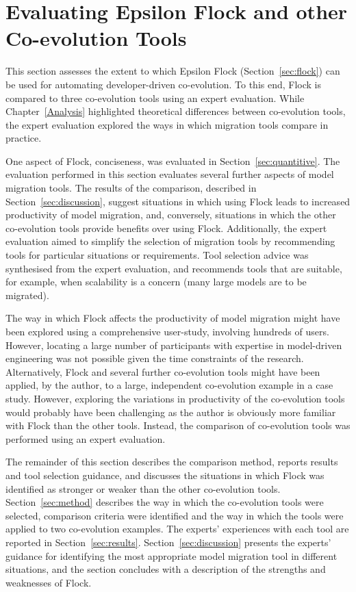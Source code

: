 
\section[Evaluating Epsilon Flock and other Co-evolution Tools][Evaluating Flock and other Co-evolution Tools]{Evaluating Epsilon Flock and other Co-evolution Tools}
\label{sec:collaborative_comparison}
This section assesses the extent to which Epsilon Flock (Section~\ref{sec:flock}) can be used for automating developer-driven co-evolution. To this end, Flock is compared to three co-evolution tools using an expert evaluation. While Chapter~\ref{Analysis} highlighted theoretical differences between co-evolution tools, the expert evaluation explored the ways in which migration tools compare in practice.

One aspect of Flock, conciseness, was evaluated in Section~\ref{sec:quantitive}. The evaluation performed in this section evaluates several further aspects of model migration tools. The results of the comparison, described in Section~\ref{sec:discussion}, suggest situations in which using Flock leads to increased productivity of model migration, and, conversely, situations in which the other co-evolution tools provide benefits over using Flock. Additionally, the expert evaluation aimed to  simplify the selection of migration tools by recommending tools for particular situations or requirements. Tool selection advice was synthesised from the expert evaluation, and recommends tools that are suitable, for example, when scalability is a concern (many large models are to be migrated).

The way in which Flock affects the productivity of model migration might have been explored using a comprehensive user-study, involving hundreds of users. However, locating a large number of participants with expertise in model-driven engineering was not possible given the time constraints of the research. Alternatively, Flock and several further co-evolution tools might have been applied, by the author, to a large, independent co-evolution example in a case study. However, exploring the variations in productivity of the co-evolution tools would probably have been challenging as the author is obviously more familiar with Flock than the other tools. Instead, the comparison of co-evolution tools was performed using an expert evaluation.

The remainder of this section describes the comparison method, reports results and tool selection guidance, and discusses the situations in which Flock was identified as stronger or weaker than the other co-evolution tools. Section~\ref{sec:method} describes the way in which the co-evolution tools were selected, comparison criteria were identified and the way in which the tools were applied to two co-evolution examples. The experts' experiences with each tool are reported in Section~\ref{sec:results}. Section~\ref{sec:discussion} presents the experts' guidance for identifying the most appropriate model migration tool in different situations, and the section concludes with a description of the strengths and weaknesses of Flock.

